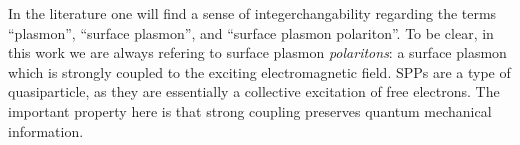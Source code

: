 In the literature one will find a sense of integerchangability regarding
the terms ``plasmon'', ``surface plasmon'', and ``surface plasmon
polariton''.  To be clear, in this work we are always refering to surface
plasmon \textit{polaritons}: a surface plasmon which is strongly coupled to
the exciting electromagnetic field.  SPPs are a type of
quasiparticle, as they are essentially a collective excitation of free
electrons.  The important property here is that strong coupling
preserves quantum mechanical information.
